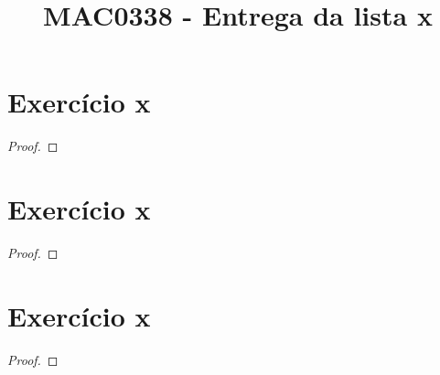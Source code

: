 \documentclass{article}
\author{}
\title{MAC0338 - Entrega da lista x}
\date{}
\begin{document}
\maketitle

\section*{Exercício x}

\begin{proof}

\end{proof}

\newpage

\section*{Exercício x}

\begin{proof}
\end{proof}

\newpage

\section*{Exercício x}

\begin{proof}
\end{proof}
\end{document}
